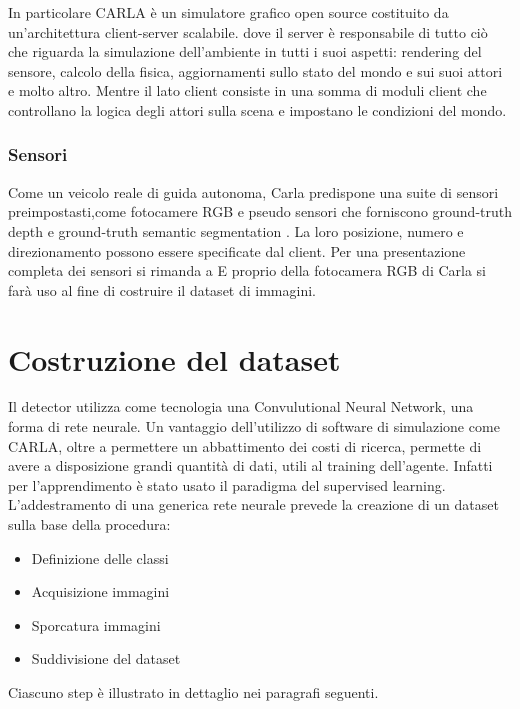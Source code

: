 \documentclass[14pt]{extarticle}
\begin{document}
In particolare CARLA è un simulatore grafico open source costituito da un'architettura client-server scalabile.
dove il server è responsabile  di tutto ciò che riguarda la simulazione dell'ambiente in tutti i suoi aspetti: rendering del sensore, calcolo della fisica, aggiornamenti sullo stato del mondo e sui suoi attori e molto altro. 
Mentre il lato client consiste in una somma di moduli client che controllano la logica degli attori sulla scena e impostano le condizioni del mondo. 
\subsubsection{Sensori}
Come un veicolo reale di guida autonoma, Carla predispone una suite di sensori preimpostasti,come fotocamere RGB e pseudo sensori che forniscono ground-truth depth e ground-truth semantic segmentation .
La loro posizione, numero e direzionamento possono essere specificate dal client.
Per una presentazione completa dei sensori si rimanda a \cite{tesi niccolo galli}
E proprio della fotocamera RGB di Carla si farà uso al fine di costruire il dataset di immagini.

\section{Costruzione del dataset}
Il detector utilizza come tecnologia una Convulutional Neural Network, una forma di rete neurale. 
Un vantaggio dell'utilizzo di software di simulazione come CARLA, oltre a permettere un abbattimento dei costi di ricerca, permette di avere a disposizione grandi quantità di dati, utili al training dell'agente.
Infatti per l'apprendimento è stato usato il paradigma del supervised learning.
L’addestramento di una generica rete neurale prevede la creazione di un dataset sulla
base della procedura:
\begin{itemize}
\item Definizione delle classi
\item Acquisizione immagini
\item Sporcatura immagini
\item Suddivisione del dataset
\end{itemize}

Ciascuno step è illustrato in dettaglio nei paragrafi seguenti.
\end{document}
